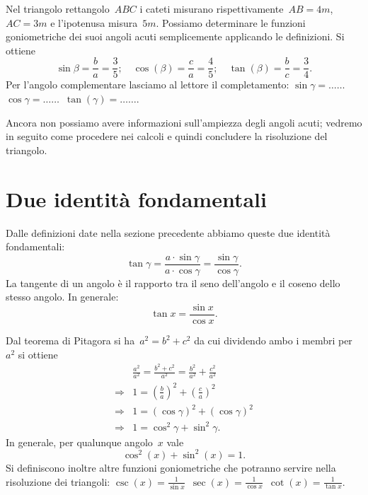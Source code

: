 \begin{exrig}
 \begin{esempio}
Nel triangolo rettangolo~$ABC$ i cateti misurano rispettivamente~$AB=4\unit{m}$, 
$AC=3\unit{m}$ e l'ipotenusa misura~$5\unit{m}$.
Possiamo determinare le funzioni goniometriche dei suoi angoli acuti 
semplicemente applicando le definizioni.
Si ottiene
\[\sin \beta =\frac{b}{a}=\frac{3}{5};\quad \cos (\beta 
)=\frac{c}{a}=\frac{4}{5};\quad \tan (\beta )=\frac{b}{c}=\frac{3}{4}.\]
Per l'angolo complementare lasciamo al lettore il completamento:
$\sin \gamma =\ldots\ldots$\quad~$\cos \gamma =\ldots\ldots$\quad~$\tan(\gamma 
)=\ldots\ldots$\quad.
 \end{esempio}
\end{exrig}

\osservazione Ancora non possiamo avere informazioni sull'ampiezza degli angoli 
acuti;
vedremo in seguito come procedere nei calcoli e quindi concludere la risoluzione 
del triangolo.


\section{Due identità fondamentali}
\label{sec:trigo_identita}

Dalle definizioni date nella sezione precedente abbiamo queste due identità 
fondamentali:
\[\tan \gamma=\frac{a\cdot \sin \gamma}{a\cdot \cos \gamma}=
\frac{\sin \gamma}{\cos \gamma}.\]
La tangente di un angolo è il rapporto tra il seno dell'angolo e il coseno dello 
stesso angolo. In generale:
 \begin{equation}
 \tan x=\frac{\sin x}{\cos x}.
 \end{equation}

Dal teorema di Pitagora si ha~$a^{2}=b^{2}+c^{2}$ da cui dividendo ambo i membri 
per~$a^{2}$ si ottiene
\begin{align*}
&\frac{a^{2}}{a^{2}}=\frac{b^{2}+c^{2}}{a^{2}}=
\frac{b^{2}}{a^{2}}+\frac{c^{2}}{a^{2}}\\
\Rightarrow & 1=\left(\frac{b}{a}\right)^{2}+\left(\frac{c}{a}\right)^{2}\\
\Rightarrow & 1=\left(\cos \gamma\right)^{2}+\left(\cos  \gamma\right)^{2}\\
\Rightarrow & 1=\cos^{2} \gamma+\sin^{2} \gamma.
\end{align*}
In generale, per qualunque angolo~$x$ vale
\begin{equation}
\label{eq:F.2}
 \cos^{2}(x)+\sin^{2}(x)=1.
\end{equation}
Si definiscono inoltre altre funzioni goniometriche che potranno servire nella 
risoluzione dei triangoli:
$\csc(x)=\frac{1}{\sin x}$\quad~$\sec(x)=\frac{1}{\cos x}$\quad~$\cot(x)=
\frac{1}{\tan x}$.

